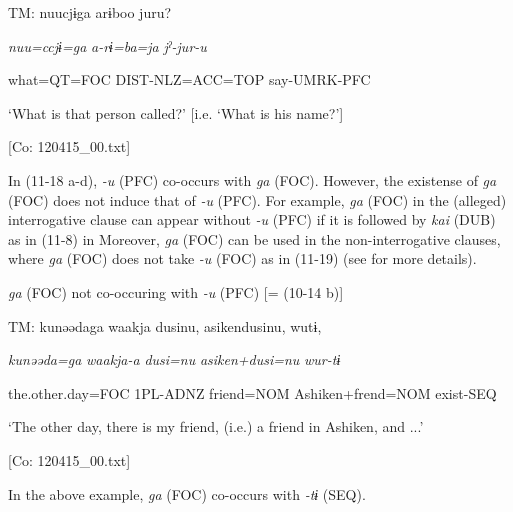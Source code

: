   \ex  TM:  nuucjɨga  arɨboo  juru?

      \textit{nuu=ccjɨ=ga}  \textit{a-rɨ=ba=ja}  \textit{jˀ-jur-u}

      what=QT=FOC  DIST-NLZ=ACC=TOP  say-UMRK-PFC

      ‘What is that person called?’ [i.e. ‘What is his name?’]

      [Co: 120415\_00.txt]
\z
\z

In (11-18 a-d), \textit{{}-u} (PFC) co-occurs with \textit{ga} (FOC). However, the existense of \textit{ga} (FOC) does not induce that of \textit{{}-u} (PFC). For example, \textit{ga} (FOC) in the (alleged) interrogative clause can appear without \textit{-u} (PFC) if it is followed by \textit{kai} (DUB) as in (11-8) in  Moreover, \textit{ga} (FOC) can be used in the non-interrogative clauses, where \textit{ga} (FOC) does not take \textit{{}-u} (FOC) as in (11-19) (see  for more details).

\ea\label{ex:11-19}  \textit{ga} (FOC) not co-occuring with \textit{-u} (PFC) [= (10-14 b)]

  TM:  kunəədaga  waakja  dusinu,  asikendusinu,  wutɨ,

    \textit{kunəəda=ga}  \textit{waakja-a}  \textit{dusi=nu}  \textit{asiken+dusi=nu}  \textit{wur-tɨ}

    the.other.day=FOC  1PL-ADNZ  friend=NOM  Ashiken+frend=NOM  exist{}-SEQ

    ‘The other day, there is my friend, (i.e.) a friend in Ashiken, and ...’

    [Co: 120415\_00.txt]
\z

In the above example, \textit{ga} (FOC) co-occurs with \textit{{}-tɨ} (SEQ).
